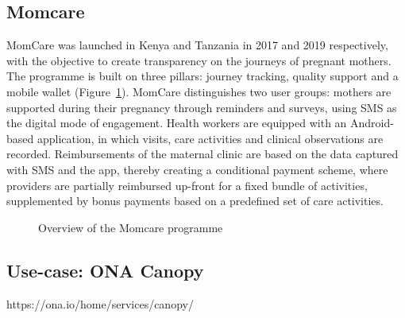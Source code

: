 \documentclass[
  authoryear]{elsarticle}
\begin{document}
\subsection{Momcare}\label{momcare}

MomCare was launched in Kenya
\citep{huisman2022digital, sanctis2022maintaining} and Tanzania
\citep{shija2021access, mrema2021application} in 2017 and 2019
respectively, with the objective to create transparency on the journeys
of pregnant mothers. The programme is built on three pillars: journey
tracking, quality support and a mobile wallet
(Figure~\ref{fig-momcare}). MomCare distinguishes two user groups:
mothers are supported during their pregnancy through reminders and
surveys, using SMS as the digital mode of engagement. Health workers are
equipped with an Android-based application, in which visits, care
activities and clinical observations are recorded. Reimbursements of the
maternal clinic are based on the data captured with SMS and the app,
thereby creating a conditional payment scheme, where providers are
partially reimbursed up-front for a fixed bundle of activities,
supplemented by bonus payments based on a predefined set of care
activities.

\begin{figure}


\caption{\label{fig-momcare}Overview of the Momcare programme}

\end{figure}%

\subsection{Use-case: ONA Canopy}\label{use-case-ona-canopy}

https://ona.io/home/services/canopy/
\end{document}
